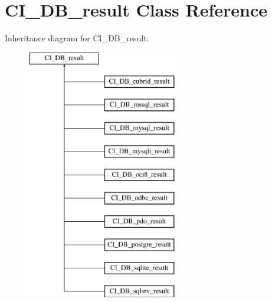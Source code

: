 \hypertarget{class_c_i___d_b__result}{\section{C\-I\-\_\-\-D\-B\-\_\-result Class Reference}
\label{class_c_i___d_b__result}
}
Inheritance diagram for C\-I\-\_\-\-D\-B\-\_\-result\-:\begin{figure}[H]
\begin{center}
\leavevmode
\includegraphics[height=11.000000cm]{class_c_i___d_b__result}
\end{center}
\end{figure}
